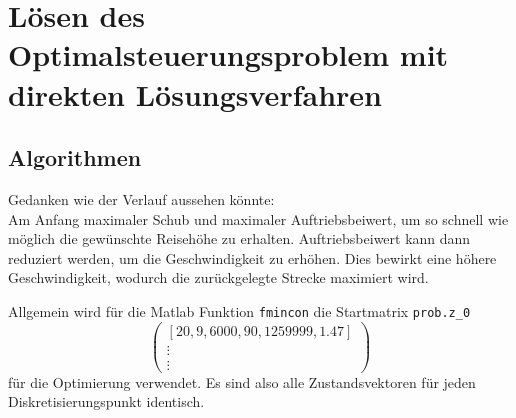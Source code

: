\chapter{Lösen des Optimalsteuerungsproblem mit direkten Lösungsverfahren}



\section{Algorithmen}



Gedanken wie der Verlauf aussehen könnte:\\
Am Anfang maximaler Schub und maximaler Auftriebsbeiwert, um so schnell wie möglich die gewünschte Reisehöhe zu erhalten. Auftriebsbeiwert kann dann reduziert werden, um die Geschwindigkeit zu erhöhen. Dies bewirkt eine höhere Geschwindigkeit, wodurch die zurückgelegte Strecke maximiert wird.


Allgemein wird für die Matlab Funktion \verb|fmincon| die Startmatrix  \verb|prob.z_0| 
\[\begin{pmatrix}
[20,9,6000,90,1259999,1.47] \\ 
\vdots \\ 
\vdots
\end{pmatrix}\]
für die Optimierung verwendet. Es sind also alle Zustandsvektoren für jeden Diskretisierungspunkt identisch.















